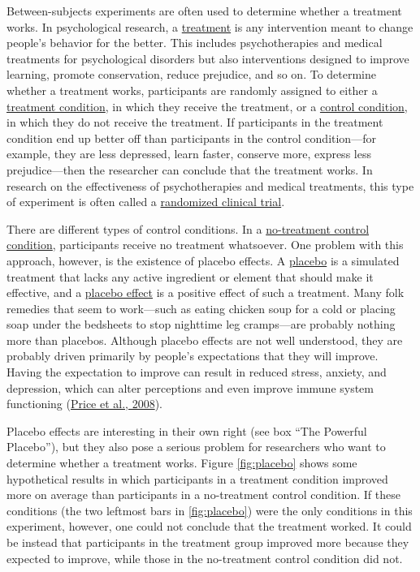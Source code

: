 \documentclass[
]{krantz}
\begin{document}
Between-subjects experiments are often used to determine whether a treatment works. In psychological research, a \protect\hyperlink{treatment}{treatment} is any intervention meant to change people's behavior for the better. This includes psychotherapies and medical treatments for psychological disorders but also interventions designed to improve learning, promote conservation, reduce prejudice, and so on. To determine whether a treatment works, participants are randomly assigned to either a \protect\hyperlink{treatment-condition}{treatment condition}, in which they receive the treatment, or a \protect\hyperlink{control-condition}{control condition}, in which they do not receive the treatment. If participants in the treatment condition end up better off than participants in the control condition---for example, they are less depressed, learn faster, conserve more, express less prejudice---then the researcher can conclude that the treatment works. In research on the effectiveness of psychotherapies and medical treatments, this type of experiment is often called a \protect\hyperlink{randomized-clinical-trial}{randomized clinical trial}.

There are different types of control conditions. In a \protect\hyperlink{no-treatment-control-condition}{no-treatment control condition}, participants receive no treatment whatsoever. One problem with this approach, however, is the existence of placebo effects. A \protect\hyperlink{placebo}{placebo} is a simulated treatment that lacks any active ingredient or element that should make it effective, and a \protect\hyperlink{placebo-effect}{placebo effect} is a positive effect of such a treatment. Many folk remedies that seem to work---such as eating chicken soup for a cold or placing soap under the bedsheets to stop nighttime leg cramps---are probably nothing more than placebos. Although placebo effects are not well understood, they are probably driven primarily by people's expectations that they will improve. Having the expectation to improve can result in reduced stress, anxiety, and depression, which can alter perceptions and even improve immune system functioning (\protect\hyperlink{ref-price2008placebo}{Price et al., 2008}).

Placebo effects are interesting in their own right (see box ``The Powerful Placebo''), but they also pose a serious problem for researchers who want to determine whether a treatment works. Figure \ref{fig:placebo} shows some hypothetical results in which participants in a treatment condition improved more on average than participants in a no-treatment control condition. If these conditions (the two leftmost bars in \ref{fig:placebo}) were the only conditions in this experiment, however, one could not conclude that the treatment worked. It could be instead that participants in the treatment group improved more because they expected to improve, while those in the no-treatment control condition did not.
\end{document}
